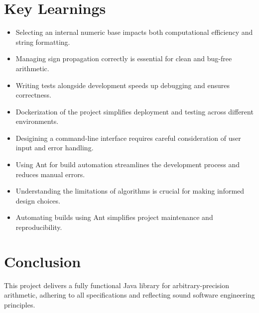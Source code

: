 \documentclass[12pt]{article}
\begin{document}
\section{Key Learnings}
\begin{itemize}
  \item Selecting an internal numeric base impacts both computational efficiency and string formatting.
  \item Managing sign propagation correctly is essential for clean and bug-free arithmetic.
  \item Writing tests alongside development speeds up debugging and ensures correctness.
  \item Dockerization of the project simplifies deployment and testing across different environments.
  \item Desigining a command-line interface requires careful consideration of user input and error handling.
  \item Using Ant for build automation streamlines the development process and reduces manual errors.
  \item Understanding the limitations of algorithms is crucial for making informed design choices.
  \item Automating builds using Ant simplifies project maintenance and reproducibility.
\end{itemize}

\section{Conclusion}
This project delivers a fully functional Java library for arbitrary-precision arithmetic, adhering to all specifications and reflecting sound software engineering principles.
\end{document}
